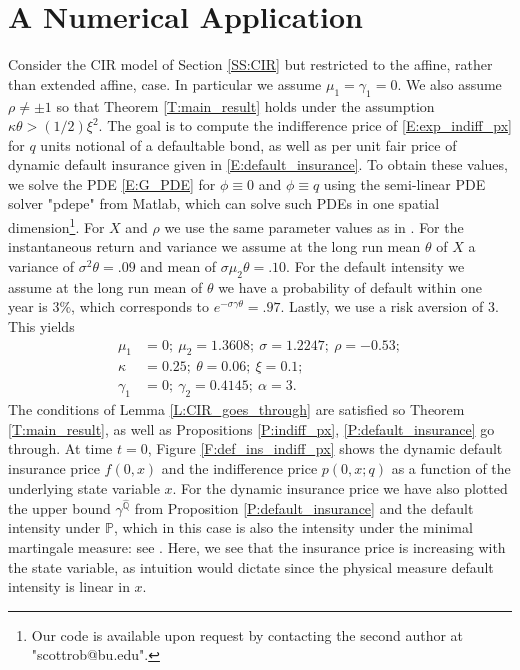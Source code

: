 \documentclass[11pt, letterpaper]{amsart}
\theoremstyle{definition}
\theoremstyle{remark}
\numberwithin{equation}{section}
\newcommand{\prob}{\mathbb{P}}
\newcommand{\qprob}{\mathbb{Q}}
\begin{document}
\section{A Numerical Application}\label{S:num_app}  Consider the CIR model of Section \ref{SS:CIR} but restricted to the affine, rather than extended affine, case.  In particular we assume $\mu_1 = \gamma_1 = 0$.  We also assume $\rho\neq\pm 1$ so that Theorem \ref{T:main_result} holds under the assumption $\kappa\theta > (1/2)\xi^2$.  The goal is to compute the indifference price of \eqref{E:exp_indiff_px} for $q$ units notional of a defaultable bond, as well as per unit fair price of dynamic default insurance given in \eqref{E:default_insurance}.  To obtain these values, we solve the PDE \eqref{E:G_PDE} for $\phi\equiv 0$ and $\phi\equiv q$ using the semi-linear PDE solver "pdepe" from Matlab, which can solve such PDEs in one spatial dimension\footnote{Our code is available upon request by contacting the second author at "scottrob@bu.edu".}.  For $X$ and $\rho$ we use the same parameter values as in \cite[Section 6]{MR2352905}. For the instantaneous return and variance we assume at the long run mean $\theta$ of $X$ a variance of $\sigma^2\theta = .09$ and mean of $\sigma\mu_2\theta = .10$. For the default intensity we assume at the long run mean of $\theta$ we have a probability of default within one year is $3\%$, which corresponds to $e^{-\sigma\gamma\theta} = .97$.  Lastly, we use a risk aversion of $3$. This yields
\begin{equation}\label{E:CIR_num_param}
\begin{split}
\mu_1 &=0;\ \mu_2 = 1.3608;\ \sigma = 1.2247;\ \rho = -0.53;\\
\kappa &= 0.25;\ \theta = 0.06;\ \xi = 0.1;\\
\gamma_1 &= 0;\ \gamma_2 = 0.4145;\ \alpha = 3.
\end{split}
\end{equation}
The conditions of Lemma \ref{L:CIR_goes_through} are satisfied so Theorem \ref{T:main_result}, as well as Propositions \ref{P:indiff_px}, \ref{P:default_insurance} go through.  At time $t=0$, Figure \ref{F:def_ins_indiff_px} shows the dynamic default insurance price $f(0,x)$ and the indifference price $p(0,x;q)$ as a function of the underlying state variable $x$.  For the dynamic insurance price we have also plotted the upper bound $\gamma^{\hat{\qprob}}$ from Proposition \ref{P:default_insurance} and the default intensity under $\prob$, which in this case is also the intensity under the minimal martingale measure: see \cite{MR1108430,MR1353193}. Here, we see that the insurance price is increasing with the state variable, as intuition would dictate since the physical measure default intensity is linear in $x$.
\end{document}
